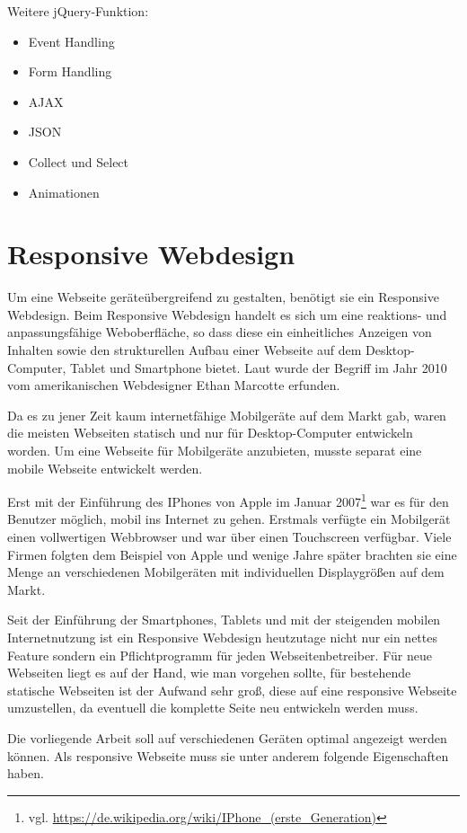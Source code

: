 Weitere jQuery-Funktion:
\begin{itemize}
\item Event Handling
\item Form Handling
\item AJAX
\item JSON
\item Collect und Select
\item Animationen
\end{itemize}

\section{Responsive Webdesign}
\label{sec:responsive webdesign}
Um eine Webseite geräteübergreifend zu gestalten, benötigt sie ein \glqq Responsive Webdesign\grqq{}. Beim Responsive Webdesign handelt es sich um eine reaktions- und anpassungsfähige Weboberfläche, so dass diese ein einheitliches Anzeigen von Inhalten sowie den strukturellen Aufbau einer Webseite auf dem Desktop-Computer, Tablet und Smartphone bietet. Laut \cite{Wiki2019c} wurde der Begriff im Jahr 2010 vom amerikanischen Webdesigner Ethan Marcotte erfunden.\bigskip

Da es zu jener Zeit kaum internetfähige Mobilgeräte auf dem Markt gab, waren die meisten Webseiten statisch und nur für Desktop-Computer entwickeln worden. Um eine Webseite für Mobilgeräte anzubieten, musste separat eine mobile Webseite entwickelt werden.\bigskip

Erst mit der Einführung des IPhones von Apple im Januar 2007\footnote{vgl. \url{https://de.wikipedia.org/wiki/IPhone_(erste_Generation)}} war es für den Benutzer möglich, mobil ins Internet zu gehen. Erstmals verfügte ein Mobilgerät einen vollwertigen Webbrowser und war über einen Touchscreen verfügbar. Viele Firmen folgten dem Beispiel von Apple und wenige Jahre später brachten sie eine Menge an verschiedenen Mobilgeräten mit individuellen Displaygrößen auf dem Markt.\bigskip

Seit der Einführung der Smartphones, Tablets und mit der steigenden mobilen Internetnutzung ist ein Responsive Webdesign heutzutage nicht nur ein nettes Feature sondern ein Pflichtprogramm für jeden Webseitenbetreiber. Für neue Webseiten liegt es auf der Hand, wie man vorgehen sollte, für bestehende statische Webseiten ist der Aufwand sehr groß, diese auf eine responsive Webseite umzustellen, da eventuell die komplette Seite neu entwickeln werden muss.\bigskip

Die vorliegende Arbeit soll auf verschiedenen Geräten optimal angezeigt werden können. Als \glqq responsive\grqq{} Webseite muss sie unter anderem folgende Eigenschaften haben.

